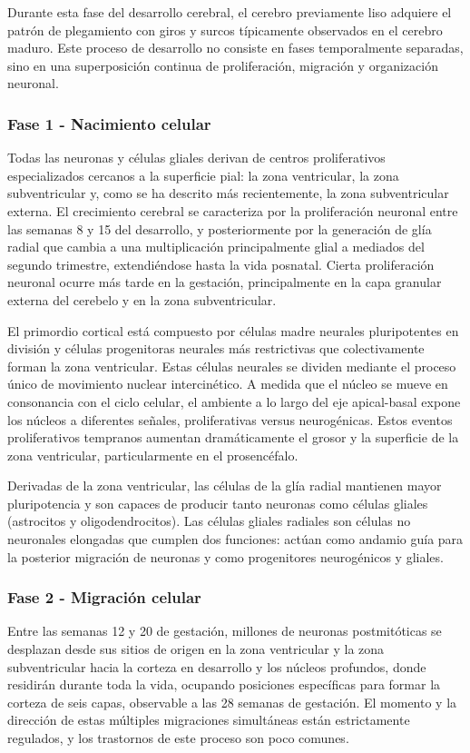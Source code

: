 \documentclass[11pt,letterpaper]{report}
\begin{document}
Durante esta fase del desarrollo cerebral, el cerebro previamente liso adquiere
el patrón de plegamiento con giros y surcos típicamente observados en el
cerebro maduro. Este proceso de desarrollo no consiste en fases temporalmente
separadas, sino en una superposición continua de proliferación, migración y
organización neuronal. \cite{Gibb2018}

\subsubsection{Fase 1 - Nacimiento celular}
Todas las neuronas y células gliales derivan de centros proliferativos
especializados cercanos a la superficie pial: la zona ventricular, la zona
subventricular y, como se ha descrito más recientemente, la zona subventricular
externa. El crecimiento cerebral se caracteriza por la proliferación neuronal
entre las semanas 8 y 15 del desarrollo, y posteriormente por la generación de
glía radial que cambia a una multiplicación principalmente glial a mediados del
segundo trimestre, extendiéndose hasta la vida posnatal. Cierta proliferación
neuronal ocurre más tarde en la gestación, principalmente en la capa granular
externa del cerebelo y en la zona subventricular. \cite{Polin124} 

El primordio cortical está compuesto por células madre neurales pluripotentes
en división y células progenitoras neurales más restrictivas que colectivamente
forman la zona ventricular. Estas células neurales se dividen mediante el
proceso único de movimiento nuclear intercinético. A medida que el núcleo se
mueve en consonancia con el ciclo celular, el ambiente a lo largo del eje
apical-basal expone los núcleos a diferentes señales, proliferativas versus
neurogénicas. Estos eventos proliferativos tempranos aumentan dramáticamente el
grosor y la superficie de la zona ventricular, particularmente en el
prosencéfalo. \cite{Polin124}

Derivadas de la zona ventricular, las células de la glía radial mantienen mayor
pluripotencia y son capaces de producir tanto neuronas como células gliales
(astrocitos y oligodendrocitos). Las células gliales radiales son células no
neuronales elongadas que cumplen dos funciones: actúan como andamio guía para
la posterior migración de neuronas y como progenitores neurogénicos y gliales.
\cite{Polin124}

\subsubsection{Fase 2 - Migración celular}
Entre las semanas 12 y 20 de gestación, millones de neuronas postmitóticas se
desplazan desde sus sitios de origen en la zona ventricular y la zona
subventricular hacia la corteza en desarrollo y los núcleos profundos, donde
residirán durante toda la vida, ocupando posiciones específicas para formar la
corteza de seis capas, observable a las 28 semanas de gestación. El momento y
la dirección de estas múltiples migraciones simultáneas están estrictamente
regulados, y los trastornos de este proceso son poco comunes.
\cite{Polin124}
\end{document}
